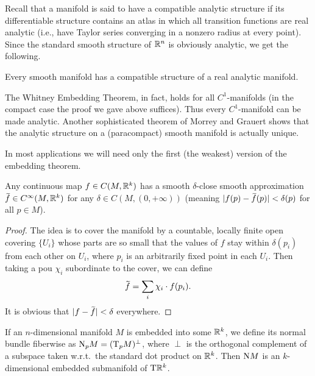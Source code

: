 Recall that a manifold is said to have a compatible analytic structure if its differentiable structure contains an atlas in which all transition functions are real analytic (i.e., have Taylor series converging in a nonzero radius at every point). Since the standard smooth structure of $\mathbb{R}^n$ is obviously analytic, we get the following.

\begin{cor}
    Every smooth manifold has a compatible structure of a real analytic manifold.
\end{cor}
\begin{rem}
    The Whitney Embedding Theorem, in fact, holds for all $C^1$-manifolds (in the compact case the proof we gave above suffices). Thus every $C^1$-manifold can be made analytic. Another sophisticated theorem of Morrey and Grauert shows that the analytic structure on a (paracompact) smooth manifold is actually unique.
\end{rem}

In most applications we will need only the first (the weakest) version of the embedding theorem.


\begin{thm}\label{cor 6.22 Lee}
    Any continuous map $f\in C(M,\mathbb{R}^k)$ has a smooth $\delta$-close smooth approximation $\wt{f}\in C^\infty(M,\bbR^k)$ for any $\delta\in C(M,(0,+\infty))$ (meaning $|f(p)-\wt f(p)|<\delta(p)$ for all $p\in M$).
\end{thm}
\begin{proof}
    The idea is to cover the manifold by a countable, locally finite open covering $\{U_i\}$ whose parts are so small that the values of $f$ stay within $\delta(p_i)$ from each other on $U_i$, where $p_i$ is an arbitrarily fixed point in each $U_i$. Then taking a \gls{pou} $\chi_i$ subordinate to the cover, we can define
    \[
        \wt{f}=\sum_i \chi_i\cdot f(p_i).
    \]
    It is obvious that $|f-\wt{f}|<\delta$ everywhere.
\end{proof}

\begin{defn}
    If an $n$-dimensional manifold $M$ is embedded into some $\mathbb{R}^k$, we define its normal bundle fiberwise as $\mathrm{N}_p M=(\mathrm{T}_p M)^\perp$, where $\perp$ is the orthogonal complement of a subspace taken w.r.t.\ the standard dot product on $\mathbb{R}^k$. Then $\mathrm{N} M$ is an $k$-dimensional embedded submanifold of $\mathrm{T}\mathbb{R}^k$.
\end{defn}

